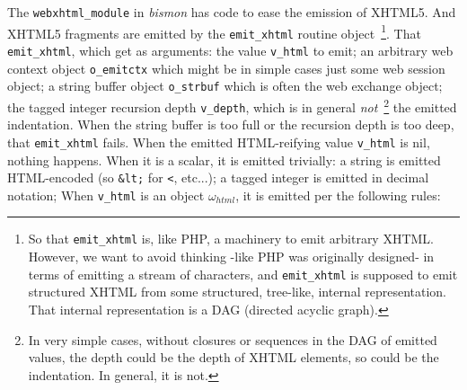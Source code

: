 The \texttt{webxhtml\_module} 
in \emph{bismon} has code to ease the emission of XHTML5. And XHTML5
fragments are emitted by the \texttt{emit\_xhtml} routine
object~\footnote{So that \texttt{emit\_xhtml} is, like PHP, a
  machinery to emit arbitrary XHTML. However, we want to avoid
  thinking -like PHP was originally designed- in terms of emitting a
  stream of characters, and \texttt{emit\_xhtml} is supposed to emit
  structured XHTML from some structured, tree-like, internal
  representation. That internal representation is a DAG (directed
  acyclic graph).}. That \texttt{emit\_xhtml}, which get as arguments:
the value \texttt{v\_html} to emit; an arbitrary web context object
\texttt{o\_emitctx} which might be in simple cases just some web
session object; a string buffer object \texttt{o\_strbuf} which is
often the web exchange object; the tagged integer recursion depth
\texttt{v\_depth}, which is in general \emph{not}~\footnote{In very
  simple cases, without closures or sequences in the DAG of emitted
  values, the depth could be the depth of XHTML elements, so could be
  the indentation. In general, it is not.} the emitted
  indentation. When the string buffer is too full or the recursion
  depth is too deep, that \texttt{emit\_xhtml} fails. When the emitted
  HTML-reifying value \texttt{v\_html} is nil, nothing happens. When
  it is a scalar, it is emitted trivially: a string is emitted
  HTML-encoded (so \texttt{\&lt;} for \texttt{<}, etc...); a tagged
  integer is emitted in decimal notation; When \texttt{v\_html} is an
  object $\omega_{html}$, it is emitted per the following rules:

